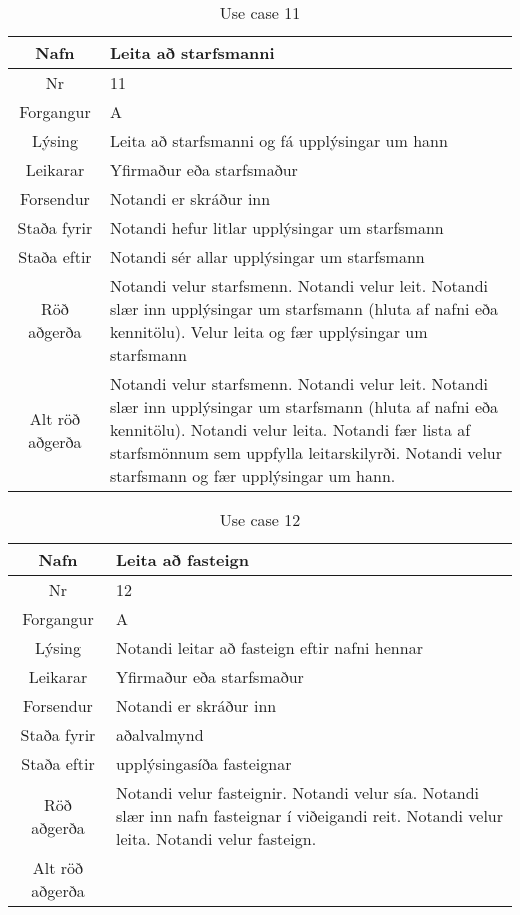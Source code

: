 \begin{table}[h!]\centering
\begin{tabular}{|c|p{10cm}|}
\hline
Nafn&Leita að starfsmanni \\
\hline
Nr&11\\
\hline
Forgangur&A\\
\hline
Lýsing&Leita að starfsmanni og fá upplýsingar um hann\\
\hline
Leikarar&Yfirmaður eða starfsmaður\\
\hline
Forsendur&Notandi er skráður inn\\
\hline
Staða fyrir&Notandi hefur litlar upplýsingar um starfsmann\\
\hline
Staða eftir&Notandi sér allar upplýsingar um starfsmann\\
\hline
Röð aðgerða&Notandi velur starfsmenn. Notandi velur leit. Notandi slær inn upplýsingar um starfsmann (hluta af nafni eða kennitölu). Velur leita og fær upplýsingar um starfsmann\\
\hline
Alt röð aðgerða&Notandi velur starfsmenn. Notandi velur leit. Notandi slær inn upplýsingar um starfsmann (hluta af nafni eða kennitölu). Notandi velur leita. Notandi fær lista af starfsmönnum sem uppfylla leitarskilyrði. Notandi velur starfsmann og fær upplýsingar um hann.\\
\hline
\end{tabular}
\caption{Use case 11}\label{tab:use_case_11}
\end{table}
\begin{table}[h!]\centering
\begin{tabular}{|c|p{10cm}|}
\hline
Nafn&Leita að fasteign \\
\hline
Nr&12\\
\hline
Forgangur&A\\
\hline
Lýsing&Notandi leitar að fasteign eftir nafni hennar\\
\hline
Leikarar&Yfirmaður eða starfsmaður\\
\hline
Forsendur&Notandi er skráður inn\\
\hline
Staða fyrir&aðalvalmynd\\
\hline
Staða eftir&upplýsingasíða fasteignar\\
\hline
Röð aðgerða&Notandi velur fasteignir. Notandi velur sía. Notandi slær inn nafn fasteignar í viðeigandi reit. Notandi velur leita. Notandi velur fasteign.\\
\hline
Alt röð aðgerða&\\
\hline
\end{tabular}
\caption{Use case 12}\label{tab:use_case_12}
\end{table}
